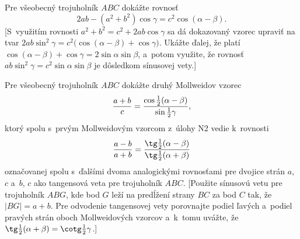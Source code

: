 {\D
Pre všeobecný trojuholník $ABC$ dokážte rovnosť
$$
2ab-(a^2+b^2)\cos\gamma=c^2\cos(\alpha-\beta).
$$
[S~využitím rovnosti $a^2+b^2=c^2+2ab\cos\gamma$ sa dá
dokazovaný vzorec upraviť na tvar
$2ab\sin^2\gamma=c^2\bigl(\cos(\alpha-\beta)+\cos\gamma\bigr)$.
Ukážte ďalej, že platí $\cos(\alpha-\beta)+\cos\gamma=2\sin\alpha\sin\beta$, a~potom
využite, že rovnosť $ab\sin^2\gamma=c^2\sin\alpha\sin\beta$ je dôsledkom
sínusovej vety.]

Pre všeobecný trojuholník $ABC$ dokážte druhý Mollweidov vzorec
$$
{a+b\over c}={\cos\frac12(\alpha-\beta)\over\sin\frac1{2}{\gamma}},
$$
ktorý spolu s~prvým Mollweidovým vzorcom z~úlohy N2 vedie
k~rovnosti
$$
\frac{a-b}{a+b}=\frac{\tg\frac12(\alpha-\beta)}{\tg\frac12(\alpha+\beta)}
$$
označovanej spolu s~ďalšími dvoma analogickými rovnosťami
pre dvojice strán $a$, $c$ a~$b$, $c$ ako tangensová veta pre trojuholník $ABC$.
[Použite sínusovú vetu pre trojuholník $ABG$, kde bod $G$ leží na predĺžení
strany $BC$ za bod $C$ tak, že $|BG|=a+b$. Pre odvodenie tangensovej
vety porovnajte podiel ľavých a~podiel pravých strán oboch
Mollweidových vzorcov a~k~tomu uvážte, že
$\tg\frac12(\alpha+\beta)=\cotg\frac12{\gamma}$.]
}

